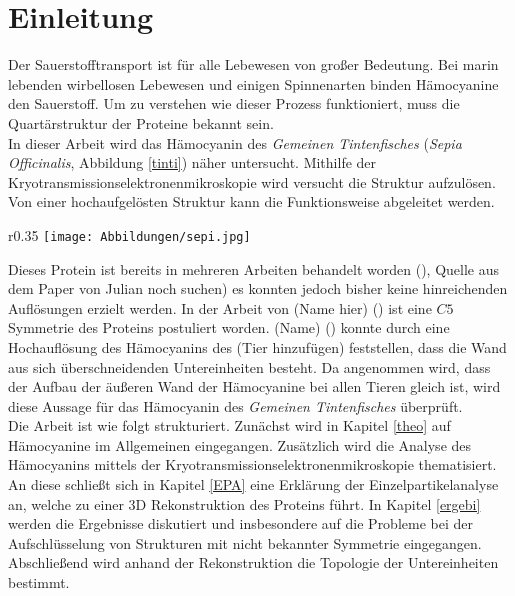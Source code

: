 
\chapter{Einleitung}
\label{einleitung}
Der Sauerstofftransport ist für alle Lebewesen von großer Bedeutung.
Bei marin lebenden wirbellosen Lebewesen und einigen Spinnenarten binden Hämocyanine den Sauerstoff. Um zu verstehen wie dieser Prozess funktioniert, muss die Quartärstruktur der Proteine bekannt sein.\\

In dieser Arbeit wird das Hämocyanin des \textit{Gemeinen Tintenfisches} (\textit{Sepia Officinalis}, Abbildung \ref{tinti}) näher untersucht. Mithilfe der Kryotransmissionselektronenmikroskopie wird versucht die Struktur aufzulösen. Von einer hochaufgelösten Struktur kann die Funktionsweise abgeleitet werden. 

\begin{wrapfigure}{r}{0.35\textwidth}
	\centering
	\texttt{[image: Abbildungen/sepi.jpg]}
	\caption[Bild eines \textit{Sepia Officinalis}]{\textit{Sepia Officinalis} (\cite{sepi_offi}).}
	\label{tinti}
\end{wrapfigure}
Dieses Protein ist bereits in mehreren Arbeiten behandelt worden (\cite{sepia_3D}), Quelle aus dem Paper von Julian noch suchen) es konnten jedoch bisher keine hinreichenden Auflösungen erzielt werden.
In der Arbeit von (Name hier) (\cite{old_struc}) ist eine $C5$ Symmetrie des Proteins postuliert worden.  (Name) (\cite{new_struc}) konnte durch eine Hochauflösung des Hämocyanins des (Tier hinzufügen) feststellen, dass die Wand aus sich überschneidenden Untereinheiten besteht.
Da angenommen wird, dass der Aufbau der äußeren Wand der Hämocyanine bei allen Tieren gleich ist, wird diese Aussage für das Hämocyanin des \textit{Gemeinen Tintenfisches} überprüft. \\

Die Arbeit ist wie folgt strukturiert.
Zunächst wird in Kapitel \ref{theo} auf Hämocyanine im Allgemeinen eingegangen.
Zusätzlich wird die Analyse des Hämocyanins mittels der Kryotransmissionselektronenmikroskopie thematisiert.
An diese schließt sich in Kapitel \ref{EPA} eine Erklärung der Einzelpartikelanalyse an, welche zu einer 3D Rekonstruktion des Proteins führt.
In Kapitel \ref{ergebi} werden die Ergebnisse diskutiert und insbesondere auf die Probleme bei der Aufschlüsselung von Strukturen mit nicht bekannter Symmetrie eingegangen.
Abschließend wird anhand der Rekonstruktion die Topologie der Untereinheiten bestimmt.

\FloatBarrier